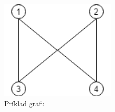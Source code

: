 \begin{figure}[H]
    \centering
    \includegraphics[width=0.5\textwidth]{subsections/images/graph_matrix.png}
    \caption{Príklad grafu}
    \label{fig:img1}
\end{figure}


